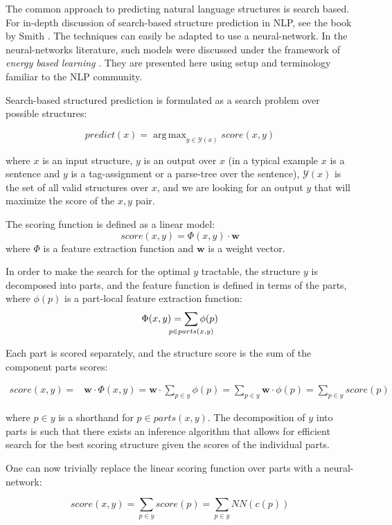 \documentclass[jair,twoside,11pt,theapa]{article}
\newcommand{\m}[1]{\mathbf{#1}}%
\DeclareMathOperator*{\argmax}{arg\,max}
\begin{document}
{The common approach to predicting natural language structures is search based.
For in-depth discussion of search-based structure prediction in NLP, see the book by Smith
\cite{smith2011linguistic}.
The techniques can easily be
adapted to use a neural-network.  In the neural-networks literature, such models
were discussed under the framework of \emph{energy based learning}
\cite[Section 7]{lecun2006tutorial}. They are presented here using setup and
terminology familiar to the NLP community.

Search-based structured prediction is formulated as a search problem over
possible structures:

\[ 
predict(x) = \argmax_{y \in \mathcal{Y}(x)} score(x,y)
\]

\noindent where $x$ is an input structure, $y$ is an output over $x$ (in a
typical example $x$ is a sentence and $y$ is a tag-assignment or a parse-tree
over the sentence), $\mathcal{Y}(x)$ is the set of all valid structures over
$x$, and we are looking for an output $y$ that will maximize the score of the $x,y$ pair.
 
The scoring function is defined as a linear model:
\[
score(x,y) = \Phi(x,y)\cdot\m{w}
\]
\noindent where $\Phi$ is a feature extraction function and $\m{w}$ is a weight vector.

In order to make the search for the optimal $y$ tractable, the structure $y$ is
decomposed into parts, and the feature function is defined in terms of the
parts, where $\phi(p)$ is a part-local feature extraction function:
\[
    \Phi(x,y) = \sum_{\mathclap{p \in parts(x,y)}} \phi(p)
\]

Each part is scored separately, and the structure score
is the sum of the component parts scores:

\begin{align*}
score(x,y) =& \m{w}\cdot\Phi(x,y) = \m{w}\cdot\sum_{p \in y} \phi(p) = \sum_{p\in y} \m{w}\cdot\phi(p) = \sum_{p \in y} score(p)
\end{align*}

\noindent where $p \in y$ is a shorthand for $p \in parts(x,y)$.
The decomposition of $y$ into parts is such that there exists an inference
algorithm that allows for efficient search for the best scoring structure given
the scores of the individual parts.

One can now trivially replace the linear scoring function over parts with a neural-network:

\[
score(x,y) = \sum_{p\in y} score(p) = \sum_{p \in y} NN(c(p))
\]

}
\end{document}
